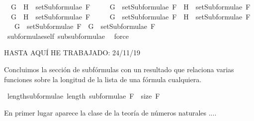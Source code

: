 \begin{isabellebody}
\ \ {\isachardoublequoteopen}G\ \isactrlbold {\isasymor}\ H\ {\isasymin}\ setSubformulae\ F\ \isanewline
\ \ \ {\isasymLongrightarrow}\ G\ {\isasymin}\ setSubformulae\ F\ {\isasymand}\ H\ {\isasymin}\ setSubformulae\ F{\isachardoublequoteclose}\isanewline
\ \ {\isachardoublequoteopen}G\ \isactrlbold {\isasymrightarrow}\ H\ {\isasymin}\ setSubformulae\ F\ \isanewline
\ \ \ {\isasymLongrightarrow}\ G\ {\isasymin}\ setSubformulae\ F\ {\isasymand}\ H\ {\isasymin}\ setSubformulae\ F{\isachardoublequoteclose}\isanewline
\ \ {\isachardoublequoteopen}\isactrlbold {\isasymnot}\ G\ {\isasymin}\ setSubformulae\ F\ {\isasymLongrightarrow}\ G\ {\isasymin}\ setSubformulae\ F{\isachardoublequoteclose}\isanewline
%
\isadelimproof
\ \ %
\endisadelimproof
%
\isatagproof
{}\isamarkupfalse%
\ subformulae{\isacharunderscore}self\ subsubformulae\ \isamarkupfalse%
\ force\isanewline
\ \ \isamarkupfalse%
%
\endisatagproof
{\isafoldproof}%
%
\isadelimproof
%
\endisadelimproof
%
\begin{isamarkuptext}%
%
\end{isamarkuptext}\isamarkuptrue%
%
\begin{isamarkuptext}%
HASTA AQUÍ HE TRABAJADO: 24/11/19%
\end{isamarkuptext}\isamarkuptrue%
%
\begin{isamarkuptext}%
Concluimos la sección de subfórmulas con un resultado que 
  relaciona varias funciones sobre la longitud de la lista 
   de una fórmula  cualquiera.%
\end{isamarkuptext}\isamarkuptrue%
\isamarkupfalse%
\ length{\isacharunderscore}subformulae{\isacharcolon}\ {\isachardoublequoteopen}length\ {\isacharparenleft}subformulae\ F{\isacharparenright}\ {\isacharequal}\ size\ F{\isachardoublequoteclose}\ \isanewline
%
\isadelimproof
\ \ %
\endisadelimproof
%
\isatagproof
{}\isamarkupfalse%
%
\endisatagproof
{\isafoldproof}%
%
\isadelimproof
%
\endisadelimproof
%
\begin{isamarkuptext}%
En primer lugar aparece la clase  de la teoría de 
  números naturales ....


\end{isamarkuptext}
\end{isabellebody}
